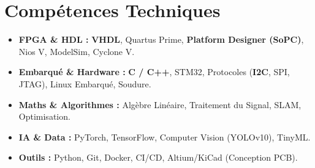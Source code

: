 \documentclass[a4paper,11pt]{article}
\begin{document}
\section{Compétences Techniques}
\begin{itemize}[leftmargin=*, nosep]
    \item \small{\textbf{FPGA \& HDL :} \textbf{VHDL}, Quartus Prime, \textbf{Platform Designer (SoPC)}, Nios V, ModelSim, Cyclone V.}
    \item \small{\textbf{Embarqué \& Hardware :} \textbf{C / C++}, STM32, Protocoles (\textbf{I2C}, SPI, JTAG), Linux Embarqué, Soudure.}
    \item \small{\textbf{Maths \& Algorithmes :} Algèbre Linéaire, Traitement du Signal, SLAM, Optimisation.}
    \item \small{\textbf{IA \& Data :} PyTorch, TensorFlow, Computer Vision (YOLOv10), TinyML.}
    \item \small{\textbf{Outils :} Python, Git, Docker, CI/CD, Altium/KiCad (Conception PCB).}
\end{itemize}

\end{document}
